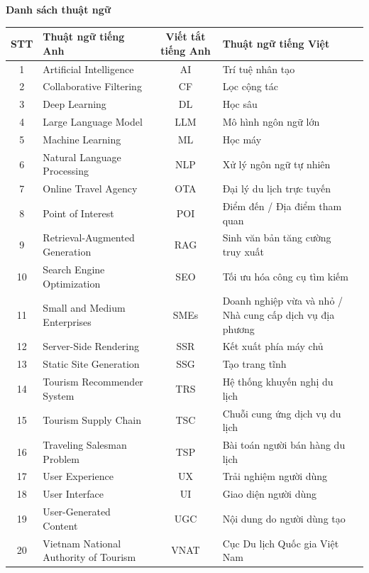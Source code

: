 \documentclass[12pt,a4paper]{article}
\theoremstyle{definition}
\begin{document}
\begin{center}
    \textbf{\Large Danh sách thuật ngữ}
\end{center}
\vspace{0.5cm}

\begin{table}[h!]
    \centering
    \renewcommand{\arraystretch}{1.3}
    \begin{tabular}{|c|p{4cm}|c|p{4.5cm}|c|}
        \hline
        \textbf{STT} & \textbf{Thuật ngữ tiếng Anh} & \textbf{Viết tắt tiếng Anh} & \textbf{Thuật ngữ tiếng Việt} \\
        \hline
        1 & Artificial Intelligence & AI & Trí tuệ nhân tạo\\
        \hline
        2 & Collaborative Filtering & CF & Lọc cộng tác\\
        \hline
        3 & Deep Learning & DL & Học sâu\\
        \hline
        4 & Large Language Model & LLM & Mô hình ngôn ngữ lớn\\
        \hline
        5 & Machine Learning & ML & Học máy\\
        \hline
        6 & Natural Language Processing & NLP & Xử lý ngôn ngữ tự nhiên \\
        \hline
        7 & Online Travel Agency & OTA & Đại lý du lịch trực tuyến \\
        \hline
        8 & Point of Interest & POI & Điểm đến / Địa điểm tham quan \\
        \hline
        9 & Retrieval-Augmented Generation & RAG & Sinh văn bản tăng cường truy xuất \\
        \hline
        10 & Search Engine Optimization & SEO & Tối ưu hóa công cụ tìm kiếm \\
        \hline
        11 & Small and Medium Enterprises & SMEs & Doanh nghiệp vừa và nhỏ / Nhà cung cấp dịch vụ địa phương \\
        \hline
        12 & Server-Side Rendering & SSR & Kết xuất phía máy chủ \\
        \hline
        13 & Static Site Generation & SSG & Tạo trang tĩnh \\
        \hline
        14 & Tourism Recommender System & TRS & Hệ thống khuyến nghị du lịch \\
        \hline
        15 & Tourism Supply Chain & TSC & Chuỗi cung ứng dịch vụ du lịch \\
        \hline
        16 & Traveling Salesman Problem & TSP & Bài toán người bán hàng du lịch \\
        \hline
        17 & User Experience & UX & Trải nghiệm người dùng \\
        \hline
        18 & User Interface & UI & Giao diện người dùng \\
        \hline
        19 & User-Generated Content & UGC & Nội dung do người dùng tạo \\
        \hline
        20 & Vietnam National Authority of Tourism & VNAT & Cục Du lịch Quốc gia Việt Nam \\
        \hline
    \end{tabular}
\end{table}
\newpage
\end{document}
